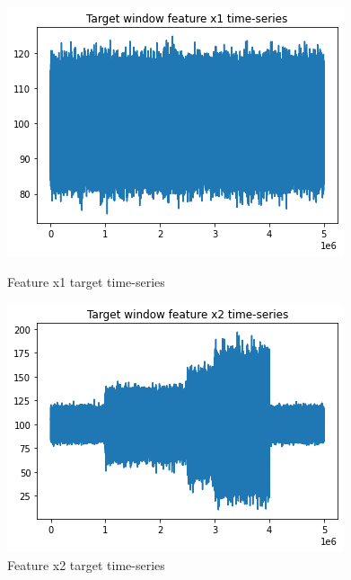 \begin{figure}[!htb] 
  \begin{minipage}[b]{0.5\linewidth}
    \centering
    \includegraphics[width=1\linewidth]{figures/timeseries-t6-x1.png} 
    \caption{Feature x1 target time-series} 
    \label{fig:timeseries-t6-x1} 
    \vspace{4ex}
  \end{minipage}%
  \begin{minipage}[b]{0.5\linewidth}
    \centering
    \includegraphics[width=1\linewidth]{figures/timeseries-t6-x2.png} 
    \caption{Feature x2 target time-series} 
    \label{fig:timeseries-t6-x2} 
    \vspace{4ex}
  \end{minipage} 

\end{figure}
